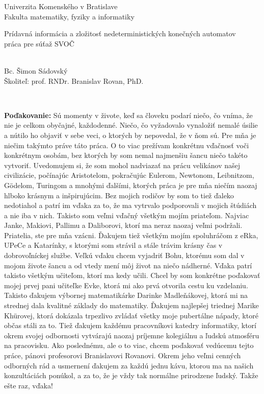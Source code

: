 \documentclass[12pt, oneside]{book}
\def\mfrok{2017}
\def\mfnazov{Prídavná informácia a zložitosť nedeterministických konečných automatov}
\def\mftyp{práca pre súťaž SVOČ}
\def\mfautor{Bc. Šimon Sádovský}
\def\mfskolitel{prof. RNDr. Branislav Rovan, PhD.}
\begin{document}
     

\thispagestyle{empty}

\begin{center}
\sc\large
Univerzita Komenského v Bratislave\\
Fakulta matematiky, fyziky a informatiky

\vfill

{\LARGE\mfnazov}\\
\mftyp
\end{center}

\vfill

{\sc\large 
\noindent \mfrok \\ \mfautor \\ Školiteľ: \mfskolitel
}

\eject %

\frontmatter

\setcounter{page}{3}
\newpage 
~

\vfill
{\bf Poďakovanie:}
Sú momenty v živote, keď sa človeku podarí niečo, čo vníma, že nie je celkom obyčajné, každodenné. Niečo, čo vyžadovalo vynaložiť nemalé úsilie a nútilo ho objaviť v sebe veci, o ktorých by nepovedal, že v ňom sú. Pre mňa je niečim takýmto práve táto práca. O to viac prežívam konkrétnu vďačnosť voči konkrétnym osobám, bez ktorých by som nemal najmenšiu šancu niečo takéto vytvoriť. Uvedomujem si, že som mohol nadviazať na prácu velikánov našej civilizácie, počínajúc Aristotelom, pokračujúc Eulerom, Newtonom, Leibnitzom, Gödelom, Turingom a mnohými ďalšími, ktorých práca je pre mňa niečím naozaj hlboko krásnym a inšpirujúcim. Bez mojich rodičov by som to tiež ďaleko nedotiahol a patrí im vďaka za to, že ma vytrvalo podporovali v mojich štúdiách a nie iba v nich. Takisto som veľmi vďačný všetkým mojím priateľom. Najviac Janke, Makiovi, Pallimu a Daliborovi, ktorí ma neraz naozaj veľmi podržali. Priatelia, ste pre mňa vzácni. Ďakujem tiež všetkým mojím spoluhráčom z eRka, UPeCe a Katarínky, s ktorými som strávil a stále trávim krásny čas v dobrovoľníckej službe. Veľkú vďaku chcem vyjadriť Bohu, ktorému som dal v mojom živote šancu a od vtedy mení môj život na niečo nádherné. Vďaka patrí takisto všetkým učiteľom, ktorí ma kedy učili. Chcel by som konkrétne poďakovať mojej prvej pani učiteľke Evke, ktorá mi ako prvá otvorila cestu ku vzdelaniu. Takisto ďakujem výbornej matematikárke Darinke Madleňákovej, ktorá mi na strednej dala kvalitné základy do matematiky. Ďakujem najlepšej triednej Marike Khürovej, ktorá dokázala trpezlivo zvládať všetky moje pubertálne nápady, ktoré občas stáli za to. Tiež ďakujem každému pracovníkovi katedry informatiky, ktorí okrem svojej odbornosti vytvárajú naozaj príjemne kolegiálnu a ľudskú atmosféru na pracovisku. Ako poslednému, ale o to viac, chcem poďakovať vedúcemu tejto práce, pánovi profesorovi Branislavovi Rovanovi. Okrem jeho veľmi cenných odborných rád a usmernení ďakujem za každú jednu kávu, ktorou ma na našich konzultáciách ponúkol, a za to, že je vždy tak normálne prirodzene ľudský. Takže ešte raz, vďaka!
\end{document}
